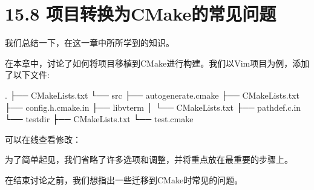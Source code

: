 \section{15.8 项目转换为CMake的常见问题}

我们总结一下，在这一章中所所学到的知识。


在本章中，讨论了如何将项目移植到CMake进行构建。我们以Vim项目为例，添加了以下文件:

\begin{codebox}[shell]
.
├── CMakeLists.txt
└── src
    ├── autogenerate.cmake
    ├── CMakeLists.txt
    ├── config.h.cmake.in
    ├── libvterm
    │    └── CMakeLists.txt
    ├── pathdef.c.in
    └── testdir
        ├── CMakeLists.txt
        └── test.cmake
\end{codebox}

可以在线查看修改： 

为了简单起见，我们省略了许多选项和调整，并将重点放在最重要的步骤上。


在结束讨论之前，我们想指出一些迁移到CMake时常见的问题。


